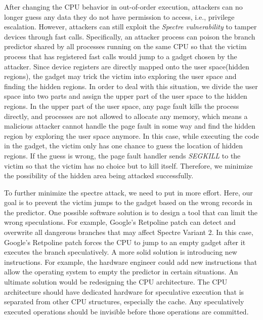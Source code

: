 After changing the CPU behavior in out-of-order execution, 
attackers can no longer guess any data they do not have permission 
to access, i.e., privilege escalation. However, attackers can still 
exploit the \emph{Spectre vulnerability}\cite{4} to tamper devices through fast calls. 
Specifically, an attacker process can poison the branch predictor 
shared by all processes running on the same CPU so that the victim 
process that has registered fast calls would jump to a gadget chosen 
by the attacker. Since device registers are directly mapped onto the 
user space(hidden regions), the gadget may trick the victim into 
exploring the user space and finding the hidden regions. 
In order to deal with this situation, we divide the user space into two 
parts and assign the upper part of the user space to the hidden regions. 
In the upper part of the user space, any page fault kills the process 
directly, and processes are not allowed to allocate any memory, 
which means a malicious attacker cannot handle the page fault in 
some way and find the hidden region by exploring the user space anymore. 
In this case, while executing the code in the gadget, the victim only 
has one chance to guess the location of hidden regions. If the guess is 
wrong, the page fault handler sends \emph{SEGKILL}\cite{21} to the 
victim so that the 
victim has no choice but to kill itself. Therefore, we minimize the 
possibility of the hidden area being attacked successfully.

To further minimize the spectre attack, we need to put in more effort. 
Here, our goal is to prevent the victim jumps to the gadget based on the wrong 
records in the predictor.  One possible software solution is to design a tool 
that can limit the wrong speculations. For example, Google's Retpoline patch can 
detect and overwrite all dangerous branches that may affect Spectre Variant 2. 
In this case, Google's Retpoline patch forces the CPU to jump to an empty gadget 
after it executes the branch speculatively. A more solid solution is introducing 
new instructions.  For example, the hardware engineer could add new instructions 
that allow the operating system to empty the predictor in certain situations. 
An ultimate solution would be redesigning the CPU architecture. The CPU architecture 
should have dedicated hardware for speculative execution that is separated from other 
CPU structures, especially the cache. Any speculatively executed operations should be 
invisible before those operations are committed.  
 \cleardoublepage

